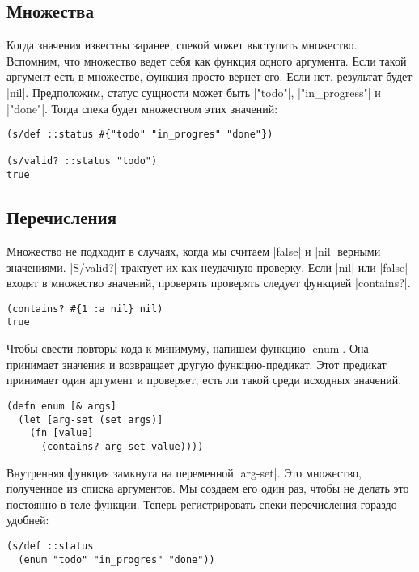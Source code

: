 \subsection{Множества}

Когда значения известны заранее, спекой может выступить множество. Вспомним, что
множество ведет себя как функция одного аргумента. Если такой аргумент есть в
множестве, функция просто вернет его. Если нет, результат будет
\spverb|nil|. Предположим, статус сущности может быть \spverb|"todo"|, \spverb|"in_progress"| и
\spverb|"done"|. Тогда спека будет множеством этих значений:

\begin{verbatim}
(s/def ::status #{"todo" "in_progres" "done"})

(s/valid? ::status "todo")
true
\end{verbatim}

\subsection{Перечисления}

Множество не подходит в случаях, когда мы считаем \spverb|false| и \spverb|nil| верными
значениями. \spverb|S/valid?| трактует их как неудачную проверку. Если \spverb|nil| или
\spverb|false| входят в множество значений, проверять проверять следует функцией
\spverb|contains?|.

\begin{verbatim}
(contains? #{1 :a nil} nil)
true
\end{verbatim}

Чтобы свести повторы кода к минимуму, напишем функцию \spverb|enum|. Она принимает
значения и возвращает другую функцию-предикат. Этот предикат принимает один
аргумент и проверяет, есть ли такой среди исходных значений.

\begin{verbatim}
(defn enum [& args]
  (let [arg-set (set args)]
    (fn [value]
      (contains? arg-set value))))
\end{verbatim}

Внутренняя функция замкнута на переменной \spverb|arg-set|. Это множество, полученное
из списка аргументов. Мы создаем его один раз, чтобы не делать это постоянно в
теле функции. Теперь регистрировать спеки-перечисления гораздо удобней:

\begin{verbatim}
(s/def ::status
  (enum "todo" "in_progres" "done"))
\end{verbatim}

